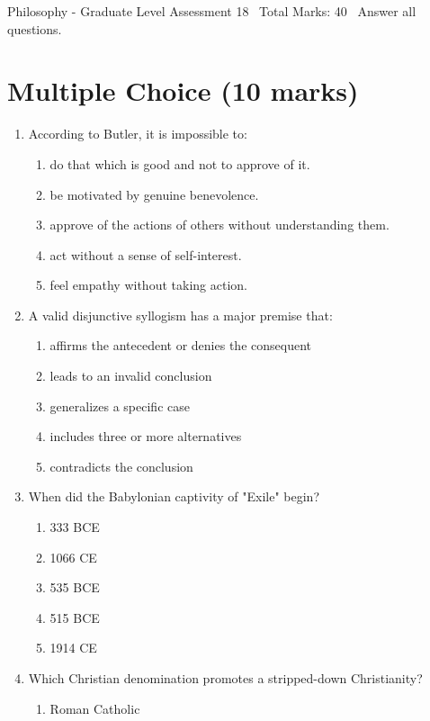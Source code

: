 \documentclass[12pt]{article}
\begin{document}
\begin{center}
Philosophy - Graduate Level Assessment 18 \
Total Marks: 40 \
Answer all questions.
\end{center}

\section*{Multiple Choice (10 marks)}
\begin{enumerate}[label=\arabic*.]
\item According to Butler, it is impossible to:
\begin{enumerate}[label=(\alph*)]
    \item do that which is good and not to approve of it.
    \item be motivated by genuine benevolence.
    \item approve of the actions of others without understanding them.
    \item act without a sense of self-interest.
    \item feel empathy without taking action.
\end{enumerate}
\item A valid disjunctive syllogism has a major premise that:
\begin{enumerate}[label=(\alph*)]
    \item affirms the antecedent or denies the consequent
    \item leads to an invalid conclusion
    \item generalizes a specific case
    \item includes three or more alternatives
    \item contradicts the conclusion
\end{enumerate}
\item When did the Babylonian captivity of "Exile" begin?
\begin{enumerate}[label=(\alph*)]
    \item 333 BCE
    \item 1066 CE
    \item 535 BCE
    \item 515 BCE
    \item 1914 CE
\end{enumerate}
\item Which Christian denomination promotes a stripped-down Christianity?
\begin{enumerate}[label=(\alph*)]
    \item Roman Catholic

\end{enumerate}
\end{enumerate}
\end{document}
